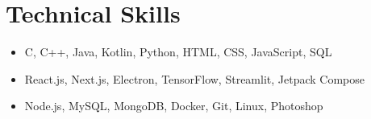 \section{Technical Skills}
\begin{itemize}[leftmargin=0.15in, label={}, itemsep=0pt, parsep=1pt]
    \small
    \item {}C, C++, Java, Kotlin, Python, HTML, CSS, JavaScript, SQL
    \item {}React.js, Next.js, Electron, TensorFlow, Streamlit, Jetpack Compose
    \item {}Node.js, MySQL, MongoDB, Docker, Git, Linux, Photoshop
\end{itemize}
